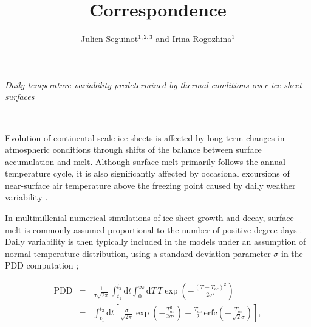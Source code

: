\documentclass[review]{igs}
\begin{document}
\title[Correspondence]{Correspondence}
\author[Seguinot and Rogozhina]{Julien Seguinot$^{1,2,3}$ and Irina Rogozhina$^1$}

\maketitle


\emph{Daily temperature variability predetermined by thermal conditions over ice sheet surfaces}

~

Evolution of continental-scale ice sheets is affected by long-term changes in atmospheric conditions through shifts of the balance between surface accumulation and melt. Although surface melt primarily follows the annual temperature cycle, it is also significantly affected by occasional excursions of near-surface air temperature above the freezing point caused by daily weather variability \citep{arnold-mackay-1964}.

In multimillenial numerical simulations of ice sheet growth and decay, surface melt is commonly assumed proportional to the number of positive degree-days \citep[PDD;][]{hock-2003}. Daily variability is then typically included in the models under an assumption of normal temperature distribution, using a standard deviation parameter $\sigma$ in the PDD computation \citep{braithwaite-1984,reeh-1991,calov-greve-2005};

\begin{eqnarray} \label{eq:pdd}
    \mathrm{PDD} &=& \frac{1}{\sigma\sqrt{2\pi}}
        \int_{t_1}^{t_2} \mathrm{d}t
        \int_{0}^{\infty} \mathrm{d}T \,
        T \exp\left({-\frac{(T-T_{ac})^2}{2\sigma^2}}\right)\\
    &=& \int_{t_1}^{t_2} \mathrm{d}t
        \left[\frac{\sigma}{\sqrt{2\pi}} \exp\left({-\frac{T_{ac}^2}{2\sigma^2}}\right)
        + \frac{T_{ac}}{2} \, \mathrm{erfc} \left(-\frac{T_{ac}}{\sqrt{2}\sigma}\right)\right],
\end{eqnarray}
\end{document}
